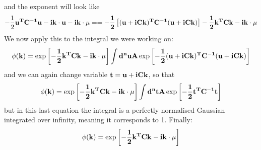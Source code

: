 \documentclass[a4paper,11pt,fleqn]{article}
\begin{document}
and the exponent will look like
\begin{multline*}
    -\frac{1}{2}\bf{u}^TC^{-1}\bf{u} - i \bf{k}\cdot \bf{u} -i \bf{k}\cdot \bf{\mu} = = -\frac{1}{2}\left[(\bf{u}+iC\bf{k})^T C^{-1} (\bf{u}+iC\bf{k})\right] -\frac{1}{2}\bf{k}^T C \bf{k} - i \bf{k} \cdot\bf{\mu}
\end{multline*}
We now apply this to the integral we were working on:
\begin{gather*}
    \phi(\bf{k}) = \exp{\left[-\frac{1}{2}\bf{k}^T C \bf{k} - i \bf{k}\cdot \bf{\mu}\right]} \int d^n u A \exp{\left[ -\frac{1}{2}(\bf{u}+iC\bf{k})^T C^{-1} (\bf{u}+iC\bf{k}) \right]}
\end{gather*}
and we can again change variable $\bf{t} = \bf{u}+iC\bf{k}$, so that
\begin{gather*}
    \phi(\bf{k}) = \exp{\left[-\frac{1}{2}\bf{k}^T C \bf{k} - i \bf{k}\cdot \bf{\mu}\right]} \int d^n t A \exp{\left[ -\frac{1}{2}\bf{t}^T C^{-1} \bf{t} \right]}
\end{gather*}
but in this last equation the integral is a perfectly normalised Gaussian integrated over infinity, meaning
it corresponds to 1. Finally:
\begin{gather*}
    \phi(\bf{k}) = \exp{\left[-\frac{1}{2}\bf{k}^T C \bf{k} - i \bf{k} \cdot \bf{\mu}\right]}
\end{gather*}
\end{document}
